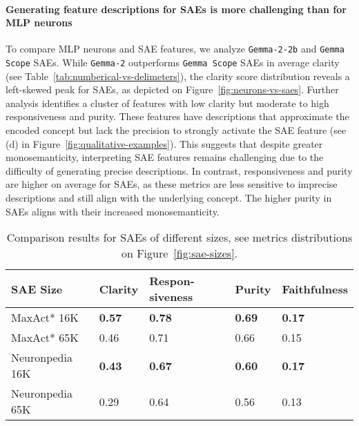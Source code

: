 \paragraph{Generating feature descriptions for SAEs is more challenging than for MLP neurons} 
To compare MLP neurons and SAE features, we analyze \texttt{Gemma-2-2b} and \texttt{Gemma Scope} SAEs. While \texttt{Gemma-2} outperforms \texttt{Gemma Scope} SAEs in average clarity (see Table~\ref{tab:numberical-vs-delimeters}), the clarity score distribution reveals a left-skewed peak for SAEs, as depicted on Figure~\ref{fig:neurons-vs-saes}. Further analysis identifies a cluster of features with low clarity but moderate to high responsiveness and purity. These features have descriptions that approximate the encoded concept but lack the precision to strongly activate the SAE feature (see (d) in Figure~\ref{fig:qualitative-examples}). This suggests that despite greater monosemanticity, interpreting SAE features remains challenging due to the difficulty of generating precise descriptions. In contrast, responsiveness and purity are higher on average for SAEs, as these metrics are less sensitive to imprecise descriptions and still align with the underlying concept. The higher purity in SAEs aligns with their increased monosemanticity.

\begin{table}[t]
\scriptsize
\centering
\begin{tabular}{p{1.8cm}p{0.9cm}p{0.9cm}p{0.9cm}p{0.9cm}} 
SAE Size        &   Clarity     & Respon-siveness & Purity         & Faithfulness     \\ \hline \hline 
MaxAct* 16K     & \textbf{0.57} &   \textbf{0.78} &  \textbf{0.69} &  \textbf{0.17}   \\
MaxAct* 65K     &    0.46       &   0.71          &  0.66          &  0.15            \\ \hline
Neuronpedia 16K & \textbf{0.43} &   \textbf{0.67} &  \textbf{0.60} &  \textbf{0.17}   \\
Neuronpedia 65K &    0.29       &   0.64          &  0.56          &  0.13            \\\hline 
\end{tabular}
\caption{Comparison results for SAEs of different sizes, see metrics distributions on Figure~\ref{fig:sae-sizes}. }
\label{tab:saes-sizes-comparison}
\end{table}
%
